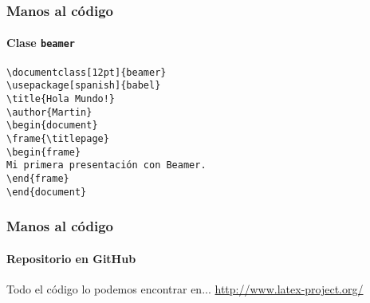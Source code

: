 \documentclass[12pt]{beamer}
\begin{document}
\begin{frame}%
  \frametitle{Manos al código}
  \framesubtitle{Clase \texttt{beamer}}
  \begin{block}{}
    \texttt{\textbackslash documentclass[12pt]\{beamer\}\\
      \textbackslash usepackage[spanish]\{babel\}\\
      \bigskip
      \textbackslash title\{Hola Mundo!\}\\
      \textbackslash author\{Martin\}\\
      \bigskip
      \textbackslash begin\{document\}\\
      \textbackslash frame\{\textbackslash titlepage\}\\
      \bigskip
      \textbackslash begin\{frame\}\\
      Mi primera presentación con Beamer.\\
      \textbackslash end\{frame\}\\
      \bigskip
      \textbackslash end\{document\}
    }
\end{block}
\end{frame}

\begin{frame}%
  \frametitle{Manos al código}
  \framesubtitle{Repositorio en GitHub}
  \begin{block}{Todo el código lo podemos encontrar en...}
    \url{http://www.latex-project.org/}
  \end{block}
\end{frame}
\end{document}
